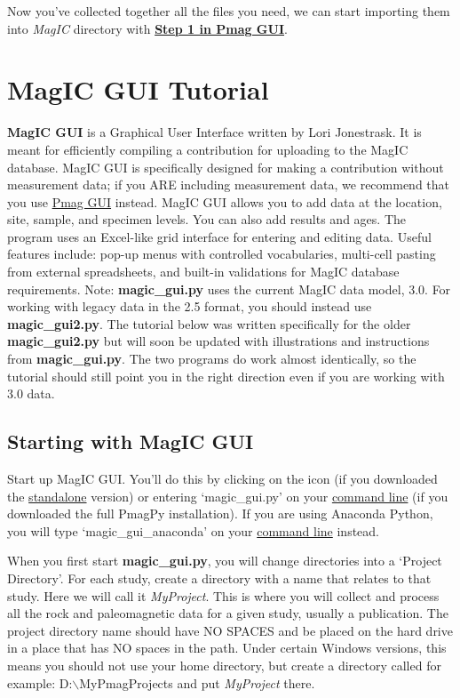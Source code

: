 \documentclass[11pt]{book}
\begin{document}
{{Now you've collected together all the files you need, we can start importing them into {\it MagIC} directory with   \href{#convert2magic}{\bf Step 1 in Pmag GUI}.




\chapter{MagIC GUI Tutorial}
\label{chap:MagIC GUI}

{\bf MagIC GUI} is a Graphical User Interface written by Lori Jonestrask.  It is meant for efficiently compiling a contribution for uploading to the MagIC database.  MagIC GUI is specifically designed for making a contribution without measurement data; if you ARE including measurement data, we recommend that you use \href{#pmag_gui.py}{Pmag GUI} instead.
MagIC GUI allows you to add data at the location, site, sample, and specimen levels.  You can also add results and ages.  The program uses an Excel-like grid interface for entering and editing data.  Useful features include: pop-up menus with controlled vocabularies, multi-cell pasting from external spreadsheets, and built-in validations for MagIC database requirements.
Note: {\bf magic\_gui.py} uses the current MagIC data model, 3.0.  For working with legacy data in the 2.5 format, you should instead use {\bf magic\_gui2.py}.  The tutorial below was written specifically for the older  {\bf magic\_gui2.py} but will soon be updated with illustrations and instructions from {\bf magic\_gui.py}. The two programs do work almost identically, so the tutorial should still point you in the right direction even if you are working with 3.0 data.


\section{Starting with MagIC GUI}
Start up MagIC GUI.  You'll do this by clicking on the icon (if you downloaded the \href{#standalone}{standalone} version) or entering `magic\_gui.py' on your \href{#command_line}{command line} (if you downloaded the full PmagPy installation).  If you are using Anaconda Python, you will type `magic\_gui\_anaconda' on your \href{#command_line}{command line} instead.

When you first start {\bf magic\_gui.py}, you will change directories into a  `Project Directory'. For each study, create a directory with a name that relates to that study. Here we will call it {\it MyProject}.  This is where you will collect  and process all the rock and paleomagnetic data for a given study, usually a publication.   The project directory name should have NO SPACES and be placed on the hard drive in a place that has NO spaces in the path. Under certain Windows versions, this means you should not use your home directory, but create a directory called for example: D:$\backslash$MyPmagProjects and put {\it MyProject} there.

}}
\end{document}
